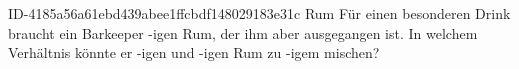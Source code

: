 \begin{exercise}
      {ID-4185a56a61ebd439abee1ffcbdf148029183e31c}
      {Rum}
  \ifproblem\problem
    Für einen besonderen Drink braucht ein Barkeeper -igen Rum, der ihm
    aber ausgegangen ist. In welchem Verhältnis könnte er -igen und
    -igen Rum zu -igem mischen?
  \fi
\end{exercise}

